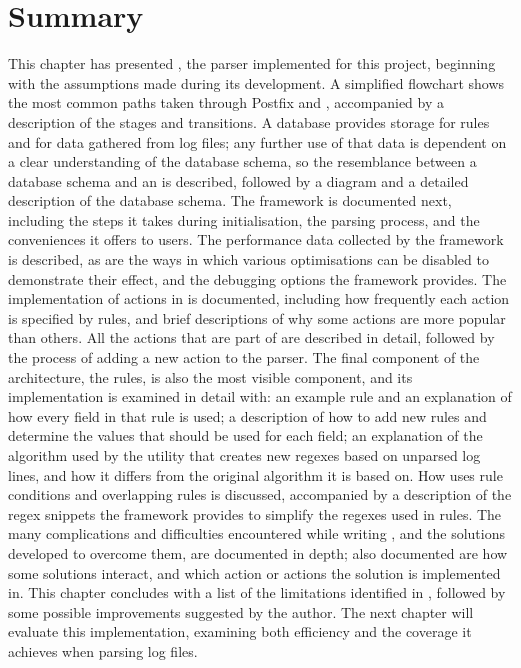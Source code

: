\section{Summary}

This chapter has presented \parsername{}, the parser implemented for this
project, beginning with the assumptions made during its development.  A
simplified flowchart shows the most common paths taken through Postfix and
\parsername{}, accompanied by a description of the stages and transitions.
A database provides storage for rules and for data gathered from log files;
any further use of that data is dependent on a clear understanding of the
database schema, so the resemblance between a database schema and an
 is described, followed by a diagram and a detailed
description of the database schema.  The framework is documented next,
including the steps it takes during initialisation, the parsing process,
and the conveniences it offers to users.  The performance data collected by
the framework is described, as are the ways in which various optimisations
can be disabled to demonstrate their effect, and the debugging options the
framework provides.  The implementation of actions in \parsername{} is
documented, including how frequently each action is specified by rules, and
brief descriptions of why some actions are more popular than others.  All
the actions that are part of \parsername{} are described in detail,
followed by the process of adding a new action to the parser.  The final
component of the architecture, the rules, is also the most visible
component, and its implementation is examined in detail with: an example
rule and an explanation of how every field in that rule is used; a
description of how to add new rules and determine the values that should be
used for each field; an explanation of the algorithm used by the utility
that creates new regexes based on unparsed log lines, and how it differs
from the original algorithm it is based on.  How \parsername{} uses rule
conditions and overlapping rules is discussed, accompanied by a description
of the regex snippets the framework provides to simplify the regexes used
in rules.  The many complications and difficulties encountered while
writing \parsername{}, and the solutions developed to overcome them, are
documented in depth; also documented are how some solutions interact, and
which action or actions the solution is implemented in.  This chapter
concludes with a list of the limitations identified in \parsername{},
followed by some possible improvements suggested by the author.  The next
chapter will evaluate this implementation, examining both \parsernames{}
efficiency and the coverage it achieves when parsing log files.
